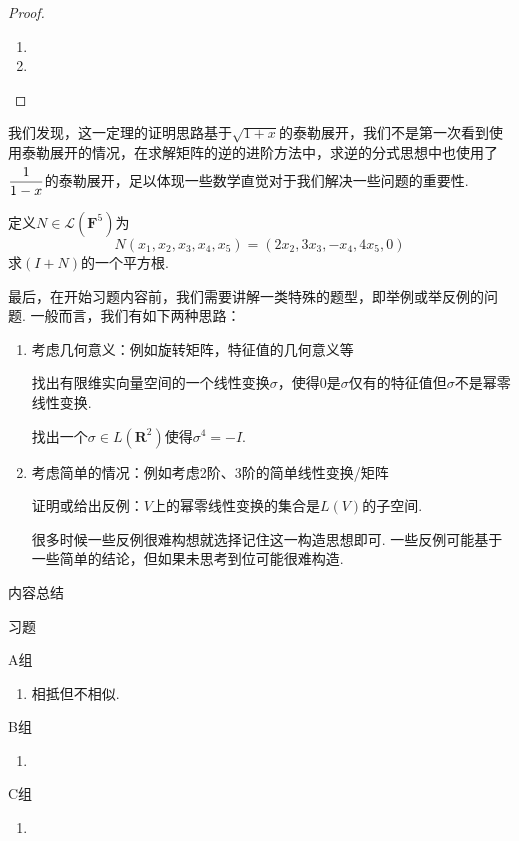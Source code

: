 \begin{proof}
    \begin{enumerate}
        \item

        \item
    \end{enumerate}
\end{proof}

我们发现，这一定理的证明思路基于$\sqrt{1+x}$的泰勒展开，我们不是第一次看到使用泰勒展开的情况，在求解矩阵的逆的进阶方法中，求逆的分式思想中也使用了 $\vphantom{\cfrac{1}{1-x}}\dfrac{1}{1-x}$的泰勒展开，足以体现一些数学直觉对于我们解决一些问题的重要性.

\begin{example}
    定义$N\in \mathcal{L}(\mathbf{F}^5)$为
    \[N(x_1,x_2,x_3,x_4,x_5)=(2x_2,3x_3,-x_4,4x_5,0)\]
    求$(I+N)$的一个平方根.
\end{example}

\begin{solution}

\end{solution}

最后，在开始习题内容前，我们需要讲解一类特殊的题型，即举例或举反例的问题. 一般而言，我们有如下两种思路：
\begin{enumerate}
    \item 考虑几何意义：例如旋转矩阵，特征值的几何意义等
          \begin{example}
              找出有限维实向量空间的一个线性变换$\sigma$，使得$0$是$\sigma$仅有的特征值但$\sigma$不是幂零线性变换.
          \end{example}
          \begin{example}
              找出一个$\sigma\in L(\mathbf{R}^2)$使得$\sigma^4=-I$.
          \end{example}
    \item 考虑简单的情况：例如考虑2阶、3阶的简单线性变换/矩阵
          \begin{example}
              证明或给出反例：$V$上的幂零线性变换的集合是$L(V)$的子空间.
          \end{example}
          很多时候一些反例很难构想就选择记住这一构造思想即可. 一些反例可能基于一些简单的结论，但如果未思考到位可能很难构造.
\end{enumerate}

\vspace{2ex}
\centerline{\heiti \Large 内容总结}

\vspace{2ex}
\centerline{\heiti \Large 习题}

\vspace{2ex}
{\kaishu }
\begin{flushright}
    \kaishu

\end{flushright}

\centerline{\heiti A组}
\begin{enumerate}
    \item 相抵但不相似.
\end{enumerate}

\centerline{\heiti B组}
\begin{enumerate}
    \item
\end{enumerate}

\centerline{\heiti C组}
\begin{enumerate}
    \item
\end{enumerate}
